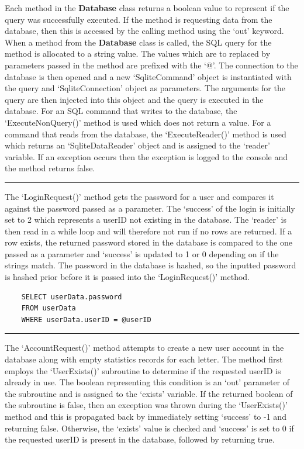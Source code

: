 \documentclass{article}
\begin{document}
Each method in the \textbf{Database} class returns a boolean value to represent if the query was successfully executed. If the method is requesting data from the database, then this is accessed by the calling method using the `out' keyword. When a method from the \textbf{Database} class is called, the SQL query for the method is allocated to a string value. The values which are to replaced by parameters passed in the method are prefixed with the `@'. The connection to the database is then opened and a new `SqliteCommand' object is instantiated with the query and `SqliteConnection' object as parameters. The arguments for the query are then injected into this object and the query is executed in the database. For an SQL command that writes to the database, the `ExecuteNonQuery()' method is used which does not return a value. For a command that reads from the database, the `ExecuteReader()' method is used which returns an `SqliteDataReader' object and is assigned to the `reader' variable.  If an exception occurs then the exception is logged to the console and the method returns false.

\begin{center}
\rule{0.5\linewidth}{0.4pt}
\end{center}

The `LoginRequest()' method gets the password for a user and compares it against the password passed as a parameter. The `success' of the login is initially set to 2 which represents a userID not existing in the database. The `reader' is then read in a while loop and will therefore not run if no rows are returned. If a row exists, the returned password stored in the database is compared to the one passed as a parameter and `success' is updated to 1 or 0 depending on if the strings match. The password in the database is hashed, so the inputted password is hashed prior before it is passed into the `LoginRequest()' method. 
\begin{verbatim}
    SELECT userData.password
    FROM userData
    WHERE userData.userID = @userID
\end{verbatim}
\begin{center}
\rule{0.5\linewidth}{0.4pt}
\end{center}

The `AccountRequest()' method attempts to create a new user account in the database along with empty statistics records for each letter. The method first employs the `UserExists()' subroutine to determine if the requested userID is already in use. The boolean representing this condition is an `out' parameter of the subroutine and is assigned to the `exists' variable. If the returned boolean of the subroutine is false, then an exception was thrown during the `UserExists()' method and this is propagated back by immediately setting `success' to -1 and returning false. Otherwise, the `exists' value is checked and `success' is set to 0 if the requested userID is present in the database, followed by returning true. \\
\end{document}
